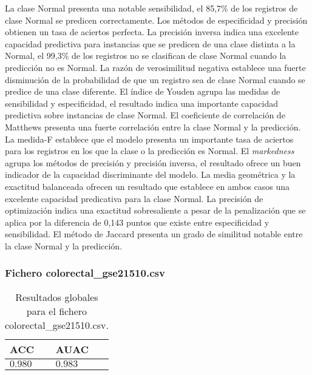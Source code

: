 La clase Normal presenta una notable sensibilidad, el 85,7\% de los registros de clase Normal se predicen correctamente. Los métodos de especificidad y precisión obtienen un tasa de aciertos perfecta. La precisión inversa indica una excelente capacidad predictiva para instancias que se predicen de una clase distinta a la Normal, el 99,3\% de los registros no se clasifican de clase Normal cuando la predicción no es Normal. La razón de verosimilitud negativa establece una fuerte disminución de la probabilidad de que un registro sea de clase Normal cuando se predice de una clase diferente. El índice de Youden agrupa las medidas de sensibilidad y especificidad, el resultado indica una importante capacidad predictiva sobre instancias de clase Normal. El coeficiente de correlación de Matthews presenta una fuerte correlación entre la clase Normal y la predicción. La medida-F establece que el modelo presenta un importante tasa de aciertos para los registros en los que la clase o la predicción es Normal. El \textit{markedness} agrupa los métodos de precisión y precisión inversa, el resultado ofrece un buen indicador de la capacidad discriminante del modelo. La media geométrica y la exactitud balanceada ofrecen un resultado que establece en ambos casos una excelente capacidad predicativa para la clase Normal. La precisión de optimización indica una exactitud sobresaliente a pesar de la penalización que se aplica por la diferencia de 0,143 puntos que existe entre especificidad y sensibilidad. El método de Jaccard presenta un grado de similitud notable entre la clase Normal y la predicción.

\clearpage


\subsubsection{Fichero colorectal\_gse21510.csv}

\begin{table}[htp]
    \small
    \centering
    \begin{tabularx}{\columnwidth}{Y Y}
        ACC       & AUAC    \\\hline
        $0.980$   & $0.983$ \\\hline
    \end{tabularx}
    \caption{Resultados globales para el fichero colorectal\_gse21510.csv.}
    \label{tab:14}
\end{table}

